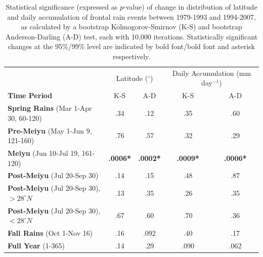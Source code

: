 \documentclass[singlecolumn,11pt]{pnas-new}
\begin{document}
\begin{table}[p]

\centering

\caption{Statistical significance (expressed as $p$-value) of change in distribution of latitude and daily accumulation of frontal rain events between 1979-1993 and 1994-2007, as calculated by a bootstrap Kolmogorov-Smirnov (K-S) and bootstrap Anderson-Darling (A-D) test, each with 10,000 iterations. Statistically significant changes at the 95\%/99\% level are indicated by bold font/bold font and asterisk respectively.}

\begin{tabular}{ l c c c c}
												& \multicolumn{2}{c}{Latitude ($^\circ$)} & \multicolumn{2}{c}{Daily Accumulation (mm day$^{-1}$)} \\
	 \textbf{Time Period} 							& K-S 			& A-D 			& K-S 			& A-D \\
	 \hline
	\textbf{Spring Rains} (Mar 1-Apr 30, 60-120)  		& .34			& .12			& .35			& .60 \\
	\textbf{Pre-Meiyu} (May 1-Jun 9, 121-160)  		& .76			&  .57 			& .32			& .29 \\
	\textbf{Meiyu} (Jun 10-Jul 19, 161-120)			& \textbf{.0006*}	&  \textbf{.0002*}	&  \textbf{.0009*}	& \textbf{.0006*} \\	
	\textbf{Post-Meiyu} (Jul 20-Sep 30) 				& .14			&  .15 			&  .48			& .87 \\
	\textbf{Post-Meiyu} (Jul 20-Sep 30), $>28^{\circ}N$   & .13			&  .35 			&  .26 			& .35 \\	
	\textbf{Post-Meiyu} (Jul 20-Sep 30), $<28^{\circ}N$   & .67			&  .60			&  .70			& .36 \\	
	\textbf{Fall Rains} (Oct 1-Nov 16) 					& .16	 		&  .092			&  .40 			& .17 \\	
	\textbf{Full Year} (1-365)						& .14			&  .29			&  .090	 		& .062 \\	
	
\end{tabular}
\label{tab:s2}
\end{table}

\clearpage

\pnasbreak


\end{document}
